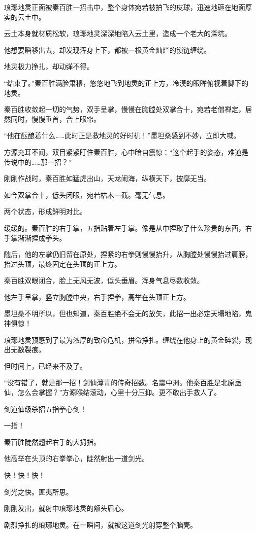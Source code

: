 \begin{this_body}
琅琊地灵正面被秦百胜一招击中，整个身体宛若被拍飞的皮球，迅速地砸在地面厚实的云土中。

云土本身就材质松软，琅琊地灵深深地陷入云土里，造成一个老大的深坑。

他想要瞬移出去，却发现浑身上下，都被一根黄金灿烂的锁链缠绕。

地灵极力挣扎，却动弹不得。

“结束了。”秦百胜满脸肃穆，悠悠地飞到地灵的正上方，冷漠的眼眸俯视着脚下的地灵。

秦百胜收敛起一切的气势，双手呈掌，慢慢在胸膛处双掌合十，宛若老僧禅定，居然同时，慢慢垂首，合上眼帘。

“他在酝酿着什么……此时正是救地灵的好时机！”墨坦桑感到不妙，立即大喊。

方源充耳不闻，双目紧紧盯住秦百胜，心中暗自震惊：“这个起手的姿态，难道是传说中的……那一招？”

刚刚作战时，秦百胜如猛虎出山，天龙闹海，纵横天下，披靡无当。

如今双掌合十，低头闭眼，宛若枯木一截。毫无气息。

两个状态，形成鲜明对比。

缓缓的。秦百胜的右手掌，五指贴着左手掌。像是从中捏取了什么珍贵的东西，右手掌渐渐捏成拳头。

随后，他的左掌仍旧留在原处，捏紧的右拳则慢慢抬升，从胸膛处慢慢抬过肩膀，抬过头顶，最终固定在头顶的正上方。

秦百胜双眼闭合，脸上无风无波，低头垂眉。浑身气息尽数收敛。

他左手呈掌，竖立胸膛中央，右手捏拳，高举在头顶正上方。

墨坦桑不明所以，但也知道，秦百胜绝不会无的放矢，此招一出必定天塌地陷，鬼神俱惊！

琅琊地灵预感到了最为浓厚的致命危机，拼命挣扎。缠绕在他身上的黄金碎裂，现出无数裂痕。

但时间上，已经来不及了。

“没有错了，就是那一招！剑仙薄青的传奇招数。名震中洲。他秦百胜是北原蛊仙，怎么会掌握？”方源喉结滚动，心里十分压抑。更不敢出手救人了。

剑道仙级杀招五指拳心剑！

一指！

秦百胜陡然翘起右手的大拇指。

他高举在头顶的右拳拳心，陡然射出一道剑光。

快！快！快！

剑光之快。匪夷所思。

刚刚发出，就射中琅琊地灵的额头眉心。

剧烈挣扎的琅琊地灵。在一瞬间，就被这道剑光射穿整个脑壳。


\end{this_body}
